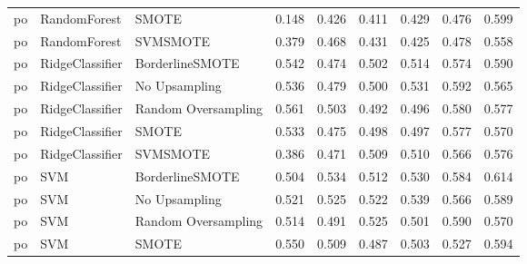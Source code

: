 \begin{tabular}{lllllllll}
      po &                 RandomForest &               SMOTE & 0.148 &                     0.426 &                 0.411 &                  0.429 &                                   0.476 &     0.599 \\
      po &                 RandomForest &            SVMSMOTE & 0.379 &                     0.468 &                 0.431 &                  0.425 &                                   0.478 &     0.558 \\
      po &              RidgeClassifier &     BorderlineSMOTE & 0.542 &                     0.474 &                 0.502 &                  0.514 &                                   0.574 &     0.590 \\
      po &              RidgeClassifier &       No Upsampling & 0.536 &                     0.479 &                 0.500 &                  0.531 &                                   0.592 &     0.565 \\
      po &              RidgeClassifier & Random Oversampling & 0.561 &                     0.503 &                 0.492 &                  0.496 &                                   0.580 &     0.577 \\
      po &              RidgeClassifier &               SMOTE & 0.533 &                     0.475 &                 0.498 &                  0.497 &                                   0.577 &     0.570 \\
      po &              RidgeClassifier &            SVMSMOTE & 0.386 &                     0.471 &                 0.509 &                  0.510 &                                   0.566 &     0.576 \\
      po &                          SVM &     BorderlineSMOTE & 0.504 &                     0.534 &                 0.512 &                  0.530 &                                   0.584 &     0.614 \\
      po &                          SVM &       No Upsampling & 0.521 &                     0.525 &                 0.522 &                  0.539 &                                   0.566 &     0.589 \\
      po &                          SVM & Random Oversampling & 0.514 &                     0.491 &                 0.525 &                  0.501 &                                   0.590 &     0.570 \\
      po &                          SVM &               SMOTE & 0.550 &                     0.509 &                 0.487 &                  0.503 &                                   0.527 &     0.594 \\

\end{tabular}
